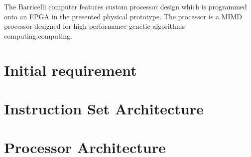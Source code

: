 The Barricelli computer features custom processor design which is programmed onto an FPGA in the presented physical prototype.
The processor is a MIMD processor designed for high performance genetic algorithms computing.computing.



\section {Initial requirement}
     \label{fpga:section:initial_requirements}

\section{Instruction Set Architecture} \label{fpga:isa:s:isa}
    

\section {Processor Architecture}
     \label{fpga:section:cpu_architecture}

